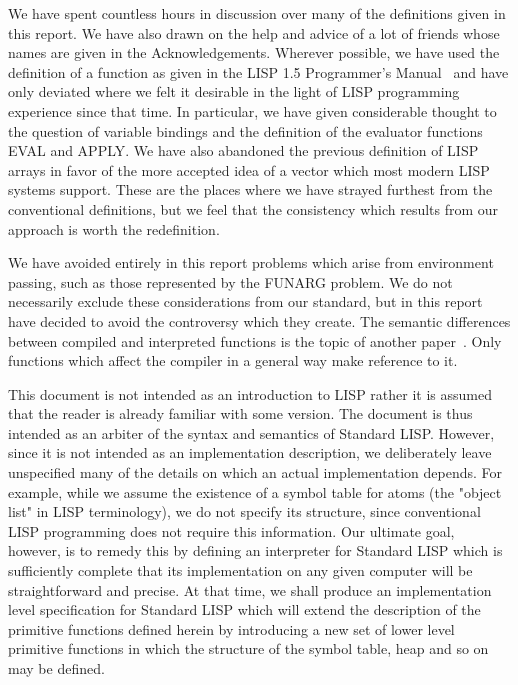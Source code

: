 \documentclass[11pt,letterpaper]{book}
\begin{document}
We have spent countless hours in discussion over many of the
definitions given in this report. We have also drawn on the help and
advice of a lot of friends whose names are given in the
Acknowledgements. Wherever possible, we have used the definition of a
function as given in the LISP 1.5 Programmer's Manual~\cite{LISP1.5}
and have only deviated where we felt it desirable in the light of LISP
programming experience since that time. In particular, we have given
considerable thought to the question of variable bindings and the
definition of the evaluator functions EVAL and APPLY. We have also
abandoned the previous definition of LISP arrays in favor of the more
accepted idea of a vector which most modern LISP systems support.
These are the places where we have strayed furthest from the
conventional definitions, but we feel that the consistency which
results from our approach is worth the redefinition.

We have avoided entirely in this report problems which arise from
environment passing, such as those represented by the FUNARG problem.
We do not necessarily exclude these considerations from our standard,
but in this report have decided to avoid the controversy which they
create. The semantic differences between compiled and interpreted
functions is the topic of another paper~\cite{PLC}. Only functions
which affect the compiler in a general way make reference to it.

This document is not intended as an introduction to LISP rather it is
assumed that the reader is already familiar with some version.  The
document is thus intended as an arbiter of the syntax and semantics of
Standard LISP. However, since it is not intended as an implementation
description, we deliberately leave unspecified many of the details on
which an actual implementation depends. For example, while we assume
the existence of a symbol table for atoms (the "object list" in LISP
terminology), we do not specify its structure, since conventional LISP
programming does not require this information. Our ultimate goal,
however, is to remedy this by defining an interpreter for Standard
LISP which is sufficiently complete that its implementation on any
given computer will be straightforward and precise. At that time, we
shall produce an implementation level specification for Standard LISP
which will extend the description of the primitive functions defined
herein by introducing a new set of lower level primitive functions in
which the structure of the symbol table, heap and so on may be
defined.
\end{document}
